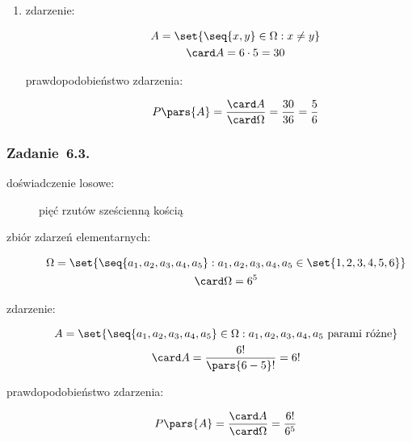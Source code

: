 \begin{enumerate}[label={\alph*)}]
\begin{description}
        \end{description}
    \item
        \begin{description}
            \item[zdarzenie:]
                \begin{gather*}
                    A = \set{\seq{x, y} \in \Omega : x \neq y}\\
                    \card A = 6 \cdot 5 = 30
                \end{gather*}
            \item[prawdopodobieństwo zdarzenia:]
                \begin{equation*}
                    P\pars{A}
                        = \frac{\card A}{\card\Omega}
                        = \frac{30}{36}
                        = \frac{5}{6}
                \end{equation*}
        \end{description}
\end{enumerate}
\subsubsection*{Zadanie~6.3.}
\begin{description}
    \item[doświadczenie losowe:] pięć rzutów sześcienną kością
    \item[zbiór zdarzeń elementarnych:]
        \begin{gather*}
            \Omega = \set{\seq{a_1, a_2, a_3, a_4, a_5} : a_1, a_2, a_3, a_4, a_5 \in \set{1, 2, 3, 4, 5, 6}}\\
            \card\Omega = 6^5
        \end{gather*}
    \item[zdarzenie:]
        \begin{gather*}
            A = \set{\seq{a_1, a_2, a_3, a_4, a_5} \in \Omega : a_1, a_2, a_3, a_4, a_5 \text{ parami różne}}\\
            \card A = \frac{6!}{\pars{6 - 5}!} = 6!
        \end{gather*}
    \item[prawdopodobieństwo zdarzenia:]
        \begin{equation*}
            P\pars{A}
                = \frac{\card A}{\card\Omega}
                = \frac{6!}{6^5}
        \end{equation*}
\end{description}
